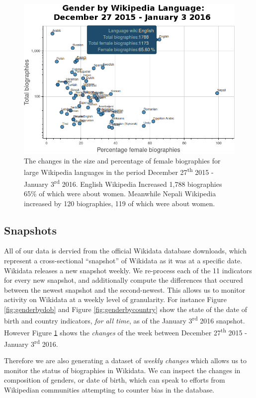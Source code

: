 \documentclass{sig-alternate-05-2015}
\begin{document}
\begin{figure}
\includegraphics[scale=0.31]{figures/genderbylang.png} 
\caption{The changes in the size and percentage of female biographies for large Wikipedia languages in the period December 27\textsuperscript{th} 2015 - January 3\textsuperscript{rd} 2016. English Wikipedia Increased 1,788 biographies 65\% of which were about women. Meanwhile Nepali Wikipedia increased by 120 biographies, 119 of which were about women.}
\label{fig:genderbylang}
\end{figure}

\subsection{Snapshots}
All of our data is dervied from the official Wikidata database downloads, which represent a cross-sectional ``snapshot'' of Wikidata as it was at a specific date. Wikidata releases a new snapshot weekly. We re-process each of the 11 indicators for every new snapshot, and additionally compute the differences that occured between the newest snapshot and the second-newest. This allows us to monitor activity on Wikidata at a weekly level of granularity. For instance Figure  \ref{fig:genderbydob} and Figure \ref{fig:genderbycountry} show the state of the date of birth and country indicators, \textit{for all time}, as of the January 3\textsuperscript{rd} 2016 snapshot. However Figure \ref{fig:genderbylang} shows the \textit{changes} of the week between December 27\textsuperscript{th} 2015 - January 3\textsuperscript{rd} 2016.

Therefore we are also generating a dataset of \textit{weekly changes} which allows us to monitor the status of biographies in Wikidata. We can inspect the changes in composition of genders, or date of birth, which can speak to efforts from Wikipedian communities attempting to counter bias in the database. 
\end{document}
